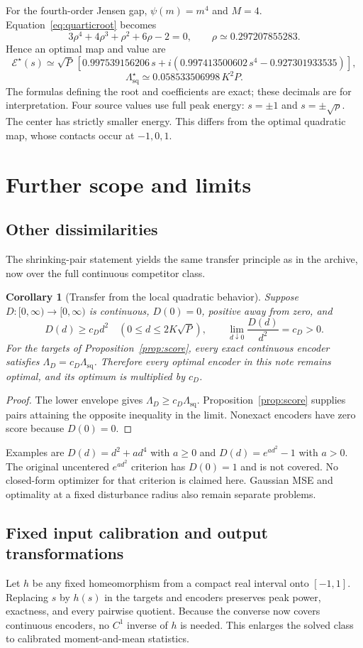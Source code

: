 \documentclass[11pt,letterpaper]{article}
\newtheorem{corollary}[theorem]{Corollary}
\theoremstyle{remark}
\newcommand{\enc}{\mathscr E}
\newcommand{\sq}{\mathrm{sq}}
\begin{document}
For the fourth-order Jensen gap, $\psi(m)=m^4$ and $M=4$. Equation~\eqref{eq:quarticroot} becomes
$$
 3\rho^4+4\rho^3+\rho^2+6\rho-2=0,
 \qquad\rho\simeq0.297207855283.
$$
Hence an optimal map and value are
$$
 \enc^\star(s)\simeq\sqrt P\,[0.997539156206\,s
 +i(0.997413500602\,s^4-0.927301933535)],
$$
$$
 \Lambda_{\sq}^\star\simeq0.058533506998\,K^2P.
$$
The formulas defining the root and coefficients are exact; these decimals are for interpretation. Four source values use full peak energy: $s=\pm1$ and $s=\pm\sqrt\rho$. The center has strictly smaller energy. This differs from the optimal quadratic map, whose contacts occur at $-1,0,1$.

\section{Further scope and limits}
\subsection{Other dissimilarities}
The shrinking-pair statement yields the same transfer principle as in the archive, now over the full continuous competitor class.

\begin{corollary}[Transfer from the local quadratic behavior]
Suppose $D:[0,\infty)\to[0,\infty)$ is continuous, $D(0)=0$, positive away from zero, and
$$
 D(d)\ge c_Dd^2\quad(0\le d\le2K\sqrt P),\qquad
 \lim_{d\downarrow0}\frac{D(d)}{d^2}=c_D>0.
$$
For the targets of Proposition~\ref{prop:score}, every exact continuous encoder satisfies $\Lambda_D=c_D\Lambda_{\sq}$. Therefore every optimal encoder in this note remains optimal, and its optimum is multiplied by $c_D$.
\end{corollary}
\begin{proof}
The lower envelope gives $\Lambda_D\ge c_D\Lambda_{\sq}$. Proposition~\ref{prop:score} supplies pairs attaining the opposite inequality in the limit. Nonexact encoders have zero score because $D(0)=0$.
\end{proof}

Examples are $D(d)=d^2+ad^4$ with $a\ge0$ and $D(d)=e^{ad^2}-1$ with $a>0$. The original uncentered $e^{ad^2}$ criterion has $D(0)=1$ and is not covered. No closed-form optimizer for that criterion is claimed here. Gaussian MSE and optimality at a fixed disturbance radius also remain separate problems.

\subsection{Fixed input calibration and output transformations}
Let $h$ be any fixed homeomorphism from a compact real interval onto $[-1,1]$. Replacing $s$ by $h(s)$ in the targets and encoders preserves peak power, exactness, and every pairwise quotient. Because the converse now covers continuous encoders, no $C^1$ inverse of $h$ is needed. This enlarges the solved class to calibrated moment-and-mean statistics.
\end{document}

